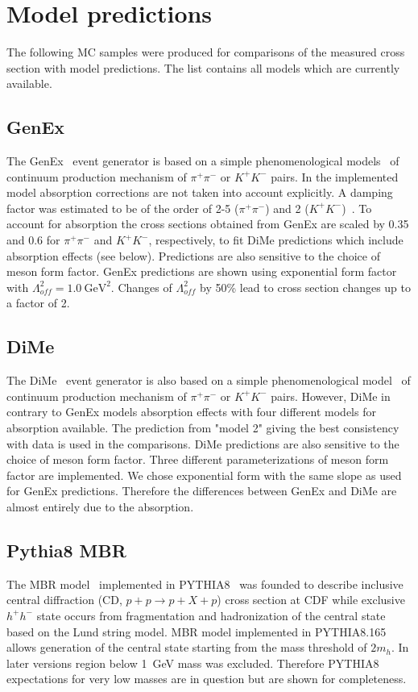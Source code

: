 \section{Model predictions}\label{sec:mcModelPred}

The following MC samples were produced for comparisons of the measured cross section with model predictions. The list contains all models which are currently available.

\subsection{GenEx}
The GenEx~\cite{GenEx} event generator is based on a simple phenomenological models~\cite{LSmodel, LSModelKK} of continuum production mechanism of $\pi^+\pi^-$ or $K^+K^-$ pairs. In the implemented model absorption corrections are not taken into account explicitly. A damping factor was estimated to be of the order of 2-5 ($\pi^+\pi^-$) and 2 ($K^+K^-$)~\cite{LSAbsorption}. To account for absorption the cross sections obtained from GenEx are scaled by 0.35 and 0.6 for $\pi^+\pi^-$ and $K^+K^-$, respectively, to fit DiMe predictions which include absorption effects (see below). Predictions are also sensitive to the choice of meson form factor. GenEx predictions are shown using exponential form factor with $\Lambda_{of\!f}^{2}=1.0~\textrm{GeV}^{2}$. Changes of $\Lambda_{of\!f}^{2}$ by 50\% lead to cross section changes up to a factor of 2.

\subsection{DiMe}
The DiMe~\cite{DurhamModel} event generator is also based on a simple phenomenological model~\cite{harland_lang_1} of continuum production mechanism of $\pi^+\pi^-$ or $K^+K^-$ pairs. However, DiMe in contrary to GenEx models absorption effects with four different models for absorption available. The prediction from "model 2" giving the best consistency with data is used in the comparisons. DiMe predictions are also sensitive to the choice of meson form factor. Three different parameterizations of meson form factor are implemented. We chose exponential form with the same slope as used for GenEx predictions. Therefore the differences between GenEx and DiMe are almost entirely due to the absorption.

\subsection{Pythia8 MBR}
The MBR model~\cite{mbr_pythia8} implemented in PYTHIA8~\cite{pythia8} was founded to describe inclusive 
central diffraction (CD, $p+p\rightarrow p+X+p$) cross section at CDF while exclusive $h^+h^-$ state occurs from fragmentation and hadronization of the central state based on the Lund string model. MBR model implemented in PYTHIA8.165 allows generation of the central state starting from the mass threshold of $2 m_h$. In later versions region below 1~GeV mass was excluded. Therefore PYTHIA8 expectations for very low masses are in question but are shown for completeness.
